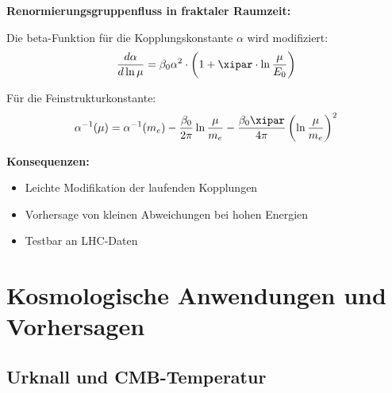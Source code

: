 	\begin{beziehung}
		\textbf{Renormierungsgruppenfluss in fraktaler Raumzeit:}
		
		Die beta-Funktion für die Kopplungskonstante $\alpha$ wird modifiziert:
		\begin{equation}
			\frac{d\alpha}{d\ln\mu} = \beta_0 \alpha^2 \cdot \left(1 + \xipar \cdot \ln\frac{\mu}{E_0}\right)
		\end{equation}
		
		Für die Feinstrukturkonstante:
		\begin{equation}
			\alpha^{-1}(\mu) = \alpha^{-1}(m_e) - \frac{\beta_0}{2\pi} \ln\frac{\mu}{m_e} - \frac{\beta_0 \xipar}{4\pi} \left(\ln\frac{\mu}{m_e}\right)^2
		\end{equation}
		
		\textbf{Konsequenzen:}
		\begin{itemize}
			\item Leichte Modifikation der laufenden Kopplungen
			\item Vorhersage von kleinen Abweichungen bei hohen Energien
			\item Testbar an LHC-Daten
		\end{itemize}
	\end{beziehung}
	
	\section{Kosmologische Anwendungen und Vorhersagen}
	
	\subsection{Urknall und CMB-Temperatur}
	
